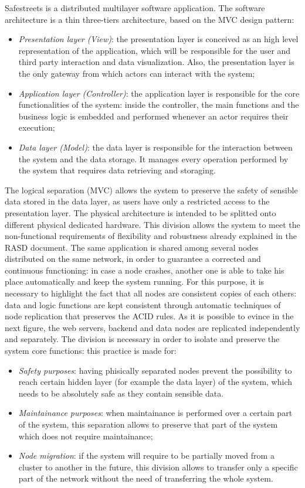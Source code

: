 Safestreets is a distributed multilayer software application. The software architecture is a thin three-tiers architecture, based on the MVC design pattern:
\begin{itemize}
    \item \textit{Presentation layer (View)}: the presentation layer is conceived as an high level representation of the application, which will be responsible for the user and third party interaction and data visualization. Also, the presentation layer is the only gateway from which actors can interact with the system;
    \item \textit{Application layer (Controller)}: the application layer is responsible for the core functionalities of the system: inside the controller, the main functions and the business logic is embedded and performed whenever an actor requires their execution;
    \item \textit{Data layer (Model)}: the data layer is responsible for the interaction between the system and the data storage. It manages every operation performed by the system that requires data retrieving and storaging.
\end{itemize}
The logical separation (MVC) allows the system to preserve the safety of sensible data stored in the data layer, as users have only a restricted access to the presentation layer.
\newline The physical architecture is intended to be splitted onto different physical dedicated hardware. This division allows the system to meet the non-functional requirements of flexibility and robustness already explained in the RASD document.
The same application is shared among several nodes distributed on the same network, in order to guarantee a corrected and continuous functioning: in case a node crashes, another one is able to take his place automatically and keep the system running. For this purpose, it is necessary to highlight the fact that all nodes are consistent copies of each others: data and logic functions are kept consistent through automatic techniques of node replication that preserves the ACID rules.  
\newline As it is possible to evince in the next figure, the web servers, backend and data nodes are replicated independently and separately.
The division is necessary in order to isolate and preserve the system core functions: this practice is made for:
\begin{itemize}
    \item \textit{Safety purposes}: having phisically separated nodes prevent the possibility to reach certain hidden layer (for example the data layer) of the system, which needs to be absolutely safe as they contain sensible data.
    \item \textit{Maintainance purposes}: when maintainance is performed over a certain part of the system, this separation allows to preserve that part of the system which does not require maintainance;
    \item \textit{Node migration}: if the system will require to be partially moved from a cluster to another in the future, this division allows to transfer only a specific part of the network without the need of transferring the whole system.
\end{itemize}
